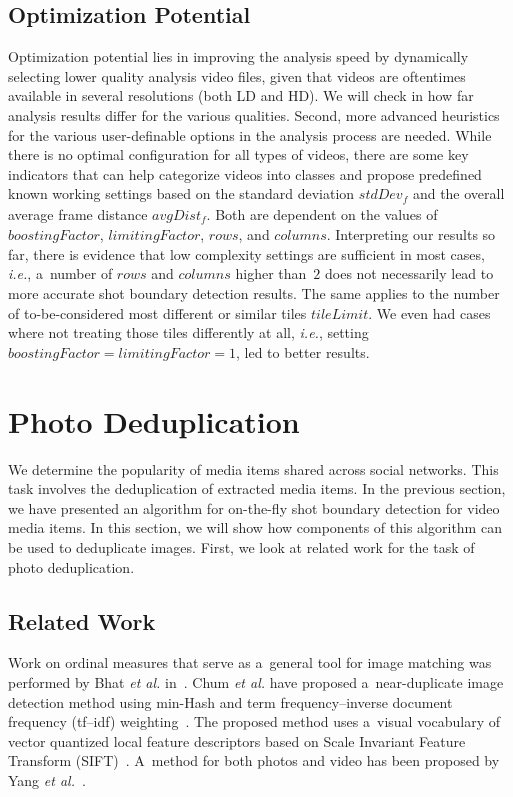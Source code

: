 \subsection{Optimization Potential}

Optimization potential lies in
improving the analysis speed by dynamically selecting
lower quality analysis video files,
given that videos are oftentimes available in several resolutions
(both LD and HD).
We will check in how far analysis results differ
for the various qualities.
Second, more advanced heuristics for the various user-definable
options in the analysis process are needed.
While there is no optimal configuration for all types of videos,
there are some key indicators that can help categorize videos
into classes and propose predefined known working settings
based on the standard deviation $\mathit{stdDev_{f}}$
and the overall average frame distance $\mathit{avgDist_{f}}$.
Both are dependent on the values of $\mathit{boostingFactor}$,
$\mathit{limitingFactor}$, $\mathit{rows}$, and $\mathit{columns}$. 
Interpreting our results so far, there is evidence
that low complexity settings are sufficient in most cases,
\emph{i.e.}, a~number of $\mathit{rows}$ and $\mathit{columns}$
higher than~$\mathit{2}$ does not necessarily
lead to more accurate shot boundary detection results.
The same applies to the number of to-be-considered most different
or similar tiles $\mathit{tileLimit}$.
We even had cases where not treating those tiles differently
at all, \emph{i.e.}, setting
$\mathit{boostingFactor} = \mathit{limitingFactor} = \mathit{1}$, 
led to better results.

\section{Photo Deduplication}

We determine the popularity of media items shared across
social networks.
This task involves the deduplication of extracted media items.
In the previous section, we have presented an algorithm
for on-the-fly shot boundary detection for video media items.
In this section, we will show how components of this algorithm
can be used to deduplicate images.
First, we look at related work for the task of photo deduplication.

\subsection{Related Work}

Work on ordinal measures that serve as a~general tool for
image matching was performed by Bhat \emph{et al.}
in~\cite{bhat1998imagecorrespondence}.
Chum \emph{et al.} have proposed a~near-duplicate image detection method using min-Hash and
term frequency--inverse document frequency (tf--idf)
weighting~\cite{chum2008nearduplicate}.
The proposed method uses a~visual vocabulary of vector quantized local feature descriptors based on
Scale Invariant Feature Transform (SIFT)~\cite{lowe1999sift}.
A~method for both photos and video has been proposed by Yang \emph{et al.}~\cite{yang2009nearduplicate}.

